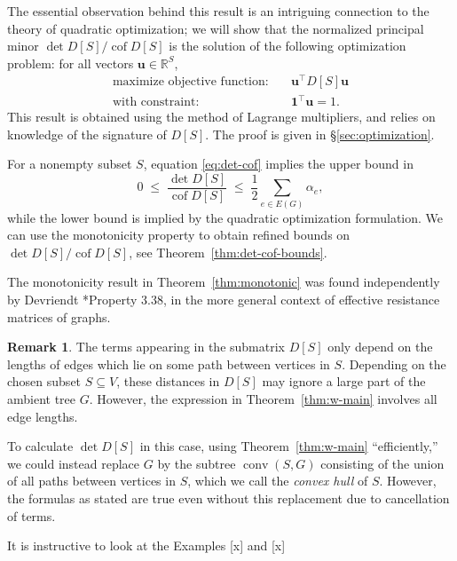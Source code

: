 \documentclass[12pt]{amsart}
\theoremstyle{definition}
\newtheorem{rmk}[thm]{Remark}
\newcommand{\RR}{\mathbb{R}}
\newcommand{\bone}{\mathbf{1}}
\newcommand{\boldu}{\mathbf{u}}
\newcommand{\tr}{\intercal}
\DeclareMathOperator{\cof}{cof}
\DeclareMathOperator{\conv}{conv}
\begin{document}
The essential observation behind this result is an intriguing connection to the theory of quadratic optimization; 
we will show that the normalized principal minor $\det D[S] / \cof D[S]$ is the solution of the following optimization problem: for all vectors $ \boldu \in \RR^S$,
\begin{align*}
	\text{maximize objective function:} &\quad \boldu^\tr D[S] \boldu \\
	\text{with constraint:} &\quad \bone^\tr \boldu = 1.
\end{align*}
This result is obtained using the method of Lagrange multipliers,
and relies on knowledge of the signature of $D[S]$.
The proof is given in \S\ref{sec:optimization}.

For a nonempty subset $S$, equation \eqref{eq:det-cof} implies the upper bound in
\begin{equation*}
	0 \;\leq\; \frac{\det D[S]}{\cof D[S]} \;\leq\; \frac12 \sum_{e \in E(G)} \alpha_e ,
\end{equation*}
while the lower bound is implied by the quadratic optimization formulation.
We can use the monotonicity property to obtain refined bounds on $\det D[S] / \cof D[S]$, see Theorem~\ref{thm:det-cof-bounds}.



The monotonicity result in Theorem~\ref{thm:monotonic} was found independently by Devriendt \cite{devriendt-thesis}*{Property 3.38},
in the more general context of effective resistance matrices of graphs.

\renewcommand*{\thethm}{\arabic{section}.\arabic{thm}}

\begin{rmk}
	The terms appearing in the submatrix $D[S]$ only depend on the lengths of edges which lie on some path between vertices in $S$.
	Depending on the chosen subset $S \subseteq V$, these distances in $D[S]$ may ignore a large part of the ambient tree $G$.
	However, the expression in Theorem~\ref{thm:w-main} involves all edge lengths.

	To calculate $\det D[S]$ in this case, using Theorem~\ref{thm:w-main} ``efficiently,'' we could instead replace $G$ by the subtree  $\conv(S,G)$ consisting of the union of all paths between vertices in $S$,
	which we call the {\em convex hull} of $S$.
	However, the formulas as stated are true even without this replacement due to cancellation of terms.

	It is instructive to look at the Examples [x] and [x] 
\end{rmk}
\end{document}
